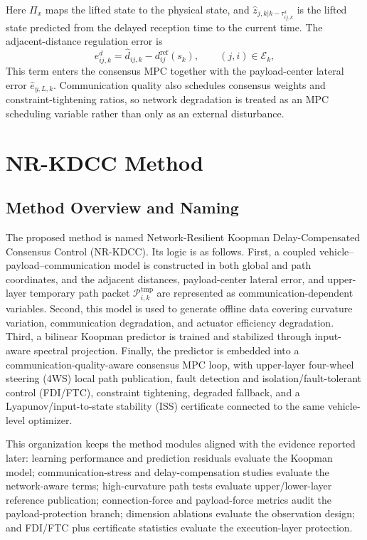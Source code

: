 \documentclass[twocolumn,3p,times,procedia]{elsarticle}
\newcommand{\Method}{NR-KDCC}
\begin{document}
Here $\Pi_x$ maps the lifted state to the physical state, and $\hat z_{j,k|k-\tau^x_{ij,k}}$ is the lifted state predicted from the delayed reception time to the current time. The adjacent-distance regulation error is
\begin{equation}
e^{d}_{ij,k}=\hat d_{ij,k}-d^{\mathrm{ref}}_{ij}(s_k),\qquad (j,i)\in\mathcal E_k ,
\label{eq:adjacent_distance_error}
\end{equation}
This term enters the consensus MPC together with the payload-center lateral error $\hat e_{y,L,k}$. Communication quality also schedules consensus weights and constraint-tightening ratios, so network degradation is treated as an MPC scheduling variable rather than only as an external disturbance.

\section{\Method{} Method}

\subsection{Method Overview and Naming}

The proposed method is named Network-Resilient Koopman Delay-Compensated Consensus Control (\Method{}). Its logic is as follows. First, a coupled vehicle--payload--communication model is constructed in both global and path coordinates, and the adjacent distances, payload-center lateral error, and upper-layer temporary path packet $\mathcal P_{i,k}^{\mathrm{tmp}}$ are represented as communication-dependent variables. Second, this model is used to generate offline data covering curvature variation, communication degradation, and actuator efficiency degradation. Third, a bilinear Koopman predictor is trained and stabilized through input-aware spectral projection. Finally, the predictor is embedded into a communication-quality-aware consensus MPC loop, with upper-layer four-wheel steering (4WS) local path publication, fault detection and isolation/fault-tolerant control (FDI/FTC), constraint tightening, degraded fallback, and a Lyapunov/input-to-state stability (ISS) certificate connected to the same vehicle-level optimizer.

This organization keeps the method modules aligned with the evidence reported later: learning performance and prediction residuals evaluate the Koopman model; communication-stress and delay-compensation studies evaluate the network-aware terms; high-curvature path tests evaluate upper/lower-layer reference publication; connection-force and payload-force metrics audit the payload-protection branch; dimension ablations evaluate the observation design; and FDI/FTC plus certificate statistics evaluate the execution-layer protection.
\end{document}
